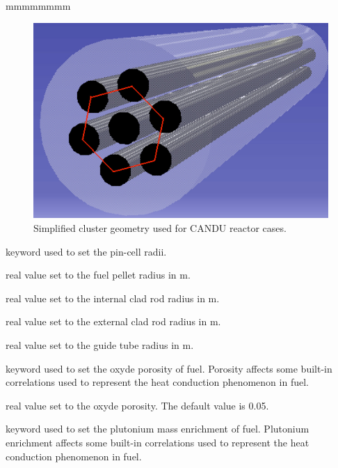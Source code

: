 \begin{ListeDeDescription}{mmmmmmmm}
\begin{figure}[h!]
  \begin{center}
    \includegraphics[scale=0.7]{Figures/cluster.eps} 
\caption{Simplified cluster geometry used for CANDU reactor cases.}\label{fig:Cluster}
  \end{center}
\end{figure}

\item[\moc{RADIUS}] keyword used to set the pin-cell radii.

\item[\dusa{r1}] real value set to the fuel pellet radius in m.

\item[\dusa{r2}] real value set to the internal clad rod radius in m.

\item[\dusa{r3}] real value set to the external clad rod radius in m.

\item[\dusa{r4}] real value set to the guide tube radius in m.

\item[\moc{POROS}] keyword used to set the oxyde porosity of fuel. Porosity affects some built-in correlations
used to represent the heat conduction phenomenon in fuel.

\item[\dusa{poros}] real value set to the oxyde porosity. The default value is 0.05.

\item[\moc{PUFR}] keyword used to set the plutonium mass enrichment of fuel. Plutonium enrichment affects some built-in correlations
used to represent the heat conduction phenomenon in fuel.


\end{ListeDeDescription}

